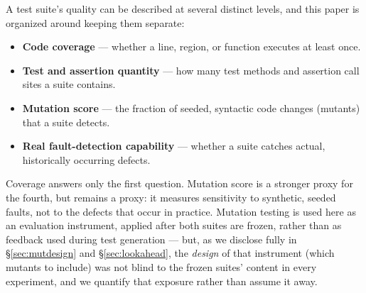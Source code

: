\documentclass[10pt,conference]{IEEEtran}
\begin{document}
A test suite's quality can be described at several distinct levels, and this paper is organized around keeping them separate:
\begin{itemize}
\item \textbf{Code coverage} — whether a line, region, or function executes at least once.
\item \textbf{Test and assertion quantity} — how many test methods and assertion call sites a suite contains.
\item \textbf{Mutation score} — the fraction of seeded, syntactic code changes (mutants) that a suite detects.
\item \textbf{Real fault-detection capability} — whether a suite catches actual, historically occurring defects.
\end{itemize}
Coverage answers only the first question. Mutation score is a stronger proxy for the fourth, but remains a proxy: it measures sensitivity to synthetic, seeded faults, not to the defects that occur in practice. Mutation testing is used here as an evaluation instrument, applied after both suites are frozen, rather than as feedback used during test generation --- but, as we disclose fully in \S\ref{sec:mutdesign} and \S\ref{sec:lookahead}, the \emph{design} of that instrument (which mutants to include) was not blind to the frozen suites' content in every experiment, and we quantify that exposure rather than assume it away.
\end{document}
